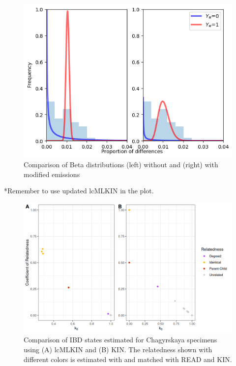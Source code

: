 \documentclass[12pt, letterpaper]{article}
\begin{document}
\begin{figure}[h!]
    \includegraphics[width=18cm]{supplementary_info/plots/contam0_inbred1_run57_coverage0.2_asc0_inputMode_hapProbs_fil0_ind0_forced_roh.png}
     \centering
    \caption{Comparison of Beta distributions (left) without and (right) with modified emissions}
    \label{figS5:ROHforced}
\end{figure}

*Remember to use updated lcMLKIN in the plot.
\begin{figure}[h!]
    \centering
    \includegraphics[width=18cm]{supplementary_info/plots/lcPlot.png}
    \caption{Comparison of IBD states estimated for Chagyrskaya specimens using (A) lcMLKIN and (B) KIN.
    The relatedness shown with different colors is estimated with and matched with READ and KIN.}
    \label{figS6:Chagyrskaya_ibd}
\end{figure}
\end{document}
